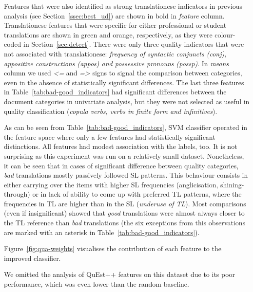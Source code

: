 Features that were also identified as strong translationese indicators in previous analysis (see Section~\ref{ssec:best_ud}) are shown in bold in \textit{feature} column. Translationese features that were specific for either professional or student translations are shown in green and orange, respectively, as they were colour-coded in Section~\ref{sec:detect}. There were only three quality indicators that were not associated with translationese: \textit{frequency of syntactic conjuncts (\textit{conj}), appositive constructions (\textit{appos}) and possessive pronouns (\textit{possp})}.
In \textit{means} column we used \textit{<=} and \textit{=>} signs to signal the comparison between categories, even in the absence of statistically significant differences.
The last three features in Table~\ref{tab:bad-good_indicators} had significant differences between the document categories in univariate analysis, but they were not selected as useful in quality classification (\textit{copula verbs, verbs in finite form and infinitives}). 

As can be seen from Table~\ref{tab:bad-good_indicators}, SVM classifier operated in the feature space where only a few features had statistically significant distinctions. All features had modest association with the labels, too. It is not surprising as this experiment was run on a relatively small dataset.
Nonetheless, it can be seen that in cases of significant difference between quality categories, \textit{bad} translations mostly passively followed SL patterns. This behaviour consists in either carrying over the items with higher SL frequencies (anglicisation, shining-through) or in lack of ability to come up with preferred TL patterns, where the frequencies in TL are higher than in the SL (\textit{underuse of TL}). 
Most comparisons (even if insignificant) showed that \textit{good} translations were almost always closer to the TL reference than \textit{bad} translations (the six exceptions from this observations are marked with an asterisk in Table~\ref{tab:bad-good_indicators}).  

Figure~\ref{fig:qua-weights} visualises the contribution of each feature to the improved classifier. 

We omitted the analysis of QuEst++ features on this dataset due to its poor performance, which was even lower than the random baseline.


